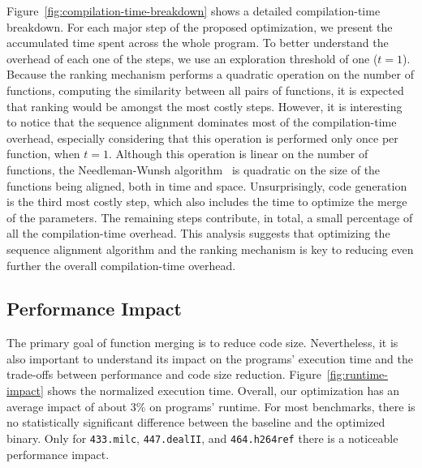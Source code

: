 Figure~\ref{fig:compilation-time-breakdown} shows a detailed compilation-time breakdown. For each major step of the proposed optimization,
we present the accumulated time spent across the whole program. To better understand the overhead of each one of the steps, we use an
exploration threshold of one ($t = 1$). Because the ranking mechanism performs a quadratic operation on the number of functions, computing
the similarity between all pairs of functions, it is expected that ranking would be amongst the most costly steps. However, it is
interesting to notice that the sequence alignment dominates most of the compilation-time overhead, especially considering that this
operation is performed only once per function, when $t = 1$. Although this operation is linear on the number of functions, the
Needleman-Wunsh algorithm~\cite{needleman70} is quadratic on the size of the functions being aligned, both in time and space.
Unsurprisingly, code generation is the third most costly step, which also includes the time to optimize the merge of the parameters. The
remaining steps contribute, in total, a small percentage of all the compilation-time overhead. This analysis suggests that optimizing the
sequence alignment algorithm and the ranking mechanism is key to reducing even further the overall compilation-time overhead.

\subsection{Performance Impact}


The primary goal of function merging is to reduce code size. Nevertheless, it is also important to understand its impact on the programs'
execution time and the trade-offs between performance and code size reduction. Figure~\ref{fig:runtime-impact} shows the normalized
execution time. Overall, our optimization has an average impact of about 3\% on programs' runtime. For most benchmarks, there is no
statistically significant difference between the baseline and the optimized binary. Only for \texttt{433.milc}, \texttt{447.dealII}, and
\texttt{464.h264ref} there is a noticeable performance impact.




